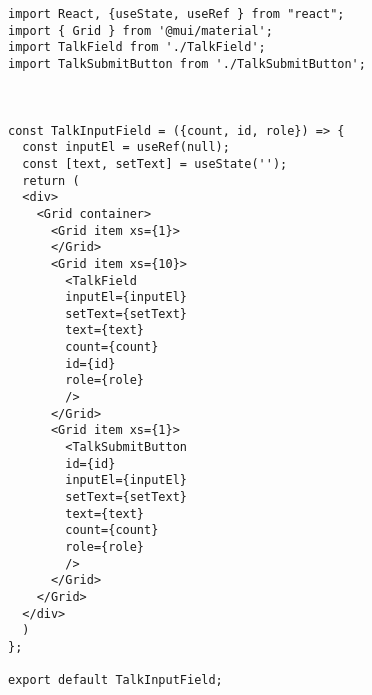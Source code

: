 \begin{verbatim}
import React, {useState, useRef } from "react";
import { Grid } from '@mui/material';
import TalkField from './TalkField';
import TalkSubmitButton from './TalkSubmitButton';



const TalkInputField = ({count, id, role}) => {
  const inputEl = useRef(null);
  const [text, setText] = useState('');
  return (
  <div>
    <Grid container>
      <Grid item xs={1}>
      </Grid>
      <Grid item xs={10}>
        <TalkField 
        inputEl={inputEl}
        setText={setText} 
        text={text} 
        count={count}
        id={id}
        role={role}
        />
      </Grid>
      <Grid item xs={1}>
        <TalkSubmitButton
        id={id}
        inputEl={inputEl}
        setText={setText} 
        text={text}
        count={count}
        role={role}
        />
      </Grid>
    </Grid>
  </div>
  )
};

export default TalkInputField;
\end{verbatim}